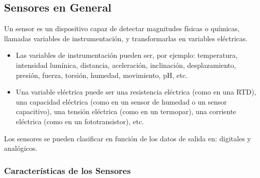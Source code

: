 \subsection{Sensores en General}

\par
Un sensor es un dispositivo capaz de detectar magnitudes físicas o químicas, llamadas variables de instrumentación, y transformarlas en variables eléctricas.\cite{sensores-wiki}

\begin{itemize}
	\item Las variables de instrumentación pueden ser, por ejemplo: temperatura, intensidad lumínica, distancia, aceleración, inclinación, desplazamiento, presión, fuerza, torsión, humedad, movimiento, pH, etc.\cite{sensores-wiki}
	
	\item Una variable eléctrica puede ser una resistencia eléctrica (como en una RTD), una capacidad eléctrica (como en un sensor de humedad o un sensor capacitivo), una tensión eléctrica (como en un termopar), una corriente eléctrica (como en un fototransistor), etc.\cite{sensores-wiki}
\end{itemize}

\par \noindent
Los sensores se pueden clasificar en función de los datos de salida en: digitales y analógicos\cite{sensores-arduino}.

\subsubsection{Características de los Sensores \cite{sensores-wiki}}

